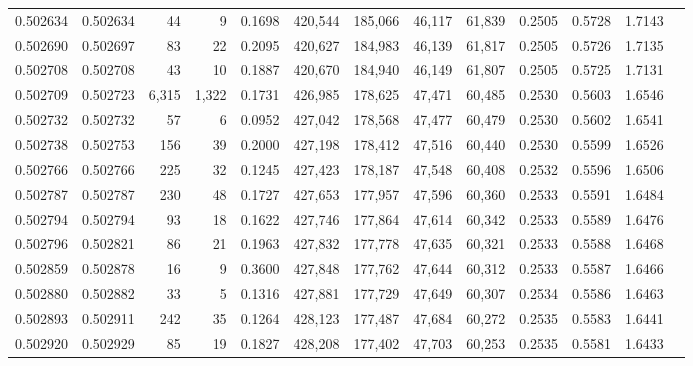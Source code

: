 \begin{tabular}{rrrrrrrrrrrrr}
0.502634 & 0.502634 &    44 &     9 &                                     0.1698 & 420,544 & 185,066 &  46,117 &  61,839 & 0.2505 & 0.5728 & 1.7143 \\
0.502690 & 0.502697 &    83 &    22 &                                     0.2095 & 420,627 & 184,983 &  46,139 &  61,817 & 0.2505 & 0.5726 & 1.7135 \\
0.502708 & 0.502708 &    43 &    10 &                                     0.1887 & 420,670 & 184,940 &  46,149 &  61,807 & 0.2505 & 0.5725 & 1.7131 \\
0.502709 & 0.502723 & 6,315 & 1,322 &                                     0.1731 & 426,985 & 178,625 &  47,471 &  60,485 & 0.2530 & 0.5603 & 1.6546 \\
0.502732 & 0.502732 &    57 &     6 &                                     0.0952 & 427,042 & 178,568 &  47,477 &  60,479 & 0.2530 & 0.5602 & 1.6541 \\
0.502738 & 0.502753 &   156 &    39 &                                     0.2000 & 427,198 & 178,412 &  47,516 &  60,440 & 0.2530 & 0.5599 & 1.6526 \\
0.502766 & 0.502766 &   225 &    32 &                                     0.1245 & 427,423 & 178,187 &  47,548 &  60,408 & 0.2532 & 0.5596 & 1.6506 \\
0.502787 & 0.502787 &   230 &    48 &                                     0.1727 & 427,653 & 177,957 &  47,596 &  60,360 & 0.2533 & 0.5591 & 1.6484 \\
0.502794 & 0.502794 &    93 &    18 &                                     0.1622 & 427,746 & 177,864 &  47,614 &  60,342 & 0.2533 & 0.5589 & 1.6476 \\
0.502796 & 0.502821 &    86 &    21 &                                     0.1963 & 427,832 & 177,778 &  47,635 &  60,321 & 0.2533 & 0.5588 & 1.6468 \\
0.502859 & 0.502878 &    16 &     9 &                                     0.3600 & 427,848 & 177,762 &  47,644 &  60,312 & 0.2533 & 0.5587 & 1.6466 \\
0.502880 & 0.502882 &    33 &     5 &                                     0.1316 & 427,881 & 177,729 &  47,649 &  60,307 & 0.2534 & 0.5586 & 1.6463 \\
0.502893 & 0.502911 &   242 &    35 &                                     0.1264 & 428,123 & 177,487 &  47,684 &  60,272 & 0.2535 & 0.5583 & 1.6441 \\
0.502920 & 0.502929 &    85 &    19 &                                     0.1827 & 428,208 & 177,402 &  47,703 &  60,253 & 0.2535 & 0.5581 & 1.6433 \\

\end{tabular}
